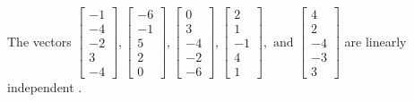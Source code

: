 \begin{exercise}
\begin{exerciseStatement}
  \end{exerciseStatement}
  \begin{exerciseAnswer}
   The vectors \(\left[\begin{array}{r}
-1 \\
-4 \\
-2 \\
3 \\
-4
\end{array}\right] , \left[\begin{array}{r}
-6 \\
-1 \\
5 \\
2 \\
0
\end{array}\right] , \left[\begin{array}{r}
0 \\
3 \\
-4 \\
-2 \\
-6
\end{array}\right] , \left[\begin{array}{r}
2 \\
1 \\
-1 \\
4 \\
1
\end{array}\right] , \text{ and } \left[\begin{array}{r}
4 \\
2 \\
-4 \\
-3 \\
3
\end{array}\right]\) are 
  	 linearly independent  .
  


  \end{exerciseAnswer}
\end{exercise}